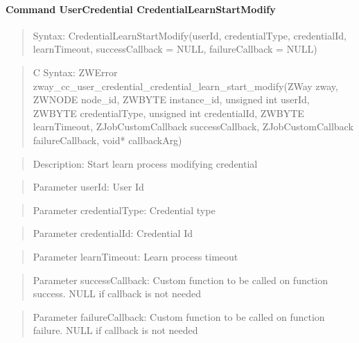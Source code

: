 \paragraph{Command UserCredential CredentialLearnStartModify}
\begin{quote}Syntax: CredentialLearnStartModify(userId, credentialType, credentialId, learnTimeout, successCallback = NULL, failureCallback = NULL)\end{quote}
\begin{quote}C Syntax: ZWError zway\_cc\_user\_credential\_credential\_learn\_start\_modify(ZWay zway, ZWNODE node\_id, ZWBYTE instance\_id, unsigned int userId, ZWBYTE credentialType, unsigned int credentialId, ZWBYTE learnTimeout, ZJobCustomCallback successCallback, ZJobCustomCallback failureCallback, void* callbackArg)\end{quote}
\begin{quote}Description: Start learn process modifying credential\end{quote}
\begin{quote}Parameter userId: User Id\end{quote}
\begin{quote}Parameter credentialType: Credential type\end{quote}
\begin{quote}Parameter credentialId: Credential Id\end{quote}
\begin{quote}Parameter learnTimeout: Learn process timeout\end{quote}
\begin{quote}Parameter successCallback: Custom function to be called on function success. NULL if callback is not needed\end{quote}
\begin{quote}Parameter failureCallback: Custom function to be called on function failure. NULL if callback is not needed\end{quote}


